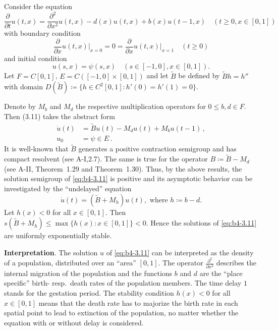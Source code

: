 \begin{example}\label{ex:b4-3.11}
	Consider the equation
\[
    \frac{\partial}{\partial t}u(t,x) = 
    \frac{\partial^2}{\partial x^2}u(t,x) - d(x)u(t,x) + b(x)u(t-1,x) \quad (t\geq0,x\in[0,1])
\]
with boundary condition
\begin{equation}\label{eq:b4-3.11}
    \frac{\partial}{\partial x}u(t,x)\big|_{x=0} = 0 = \frac{\partial}{\partial x}u(t,x)\big|_{x=1} \quad (t\geq0)
\end{equation}
and initial condition
\[
	u(s,x) = \psi(s,x) \quad (s\in[-1,0],x\in[0,1]) .
\]
Let $F = C[0,1]$, $E = C([-1,0]\times[0,1])$ and let $\tilde{B}$ be defined by $\tilde{B}h = h''$ with domain $D(\tilde{B}) \coloneq  \{h \in C^2[0,1] \colon h'(0) = h'(1) = 0\}$.

Denote by $M_b$ and $M_d$ the respective multiplication operators for $0 \leq b,d \in F$. 
Then (3.11) takes the abstract form
\begin{align*}
	\dot{u}(t) &= \tilde{B}u(t) - M_du(t) + M_bu(t-1)\,,\\
	u_0 &= \psi \in E\,.
\end{align*}
It is well-known that $\tilde{B}$ generates a positive contraction semigroup and has compact resolvent (see A-I,2.7). 
The same is true for the operator $B  \coloneq  \tilde{B} - M_d$ (see A-II, Theorem~1.29 and Theorem~1.30). 
Thus, by the above results, the solution semigroup of \eqref{eq:b4-3.11} is positive and its asymptotic behavior can be investigated by the \enquote{undelayed} equation
\[
\dot{u}(t) = (\tilde{B} + M_h)u(t) , \text{ where } h \coloneq  b - d .
\]
Let $h(x) < 0$ for all $x \in [0,1]$.
Then $s(\tilde{B} + M_h) \leq \max\{h(x) \colon x \in [0,1]\} < 0$. 
Hence the solutions of \eqref{eq:b4-3.11} are uniformly exponentially stable.
\end{example}

\textbf{Interpretation}.\quad
	The solution $u$ of \eqref{eq:b4-3.11} can be interpreted as the density of a population, distributed over an \enquote{area} $[0,1]$.
	The operator $\frac{\partial^2}{\partial x^2}$ describes the internal migration of the population and the functions $b$ and $d$ are the \enquote{place specific} birth- resp.\ death rates of the population members. 
	The time delay $1$ stands for the gestation period. 
	The stability condition $h(x) < 0$ for all $x \in [0,1]$ means that the death rate has to majorize the birth rate in each spatial point to lead to extinction of the population, no matter whether the equation with or without delay is considered.

